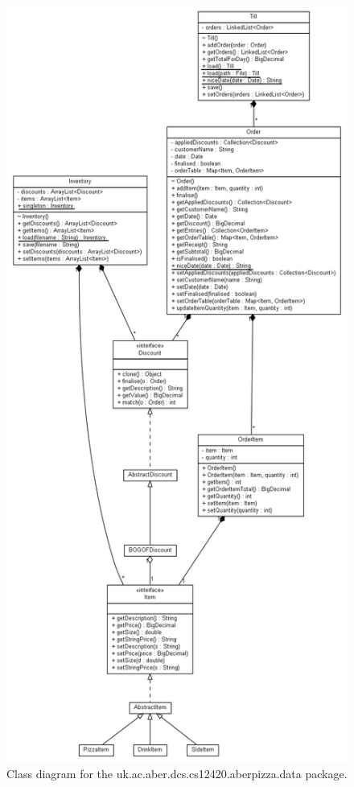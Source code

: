 \documentclass[11pt]{article} %
\begin{document}
\begin{figure}[h!]
\caption{Class diagram for the uk.ac.aber.dcs.cs12420.aberpizza.data package.}
\includegraphics[scale=0.35]{classdiagram.png}
\end{figure}
\end{document}
